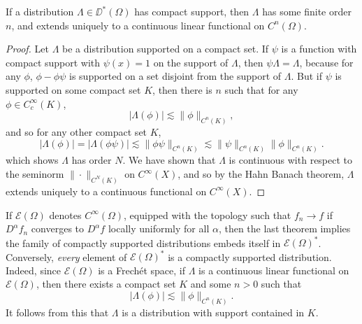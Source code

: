 \begin{theorem}
    If a distribution $\Lambda \in \DD^*(\Omega)$ has compact support, then $\Lambda$ has some finite order $n$, and extends uniquely to a continuous linear functional on $C^n(\Omega)$.
\end{theorem}
\begin{proof}
    Let $\Lambda$ be a distribution supported on a compact set. If $\psi$ is a function with compact support with $\psi(x) = 1$ on the support of $\Lambda$, then $\psi \Lambda = \Lambda$, because for any $\phi$, $\phi - \phi \psi$ is supported on a set disjoint from the support of $\Lambda$. But if $\psi$ is supported on some compact set $K$, then there is $n$ such that for any $\phi \in C_c^\infty(K)$,
    \[ |\Lambda(\phi)| \lesssim \| \phi \|_{C^n(K)}, \]
    and so for any other compact set $K$,
    \[ |\Lambda(\phi)| = |\Lambda(\phi \psi)| \lesssim \| \phi \psi \|_{C^n(K)} \lesssim \| \psi \|_{C^n(K)} \| \phi \|_{C^n(K)}. \]
    which shows $\Lambda$ has order $N$. We have shown that $\Lambda$ is continuous with respect to the seminorm $\| \cdot \|_{C^N(K)}$ on $C^\infty(X)$, and so by the Hahn Banach theorem, $\Lambda$ extends uniquely to a continuous functional on $C^\infty(X)$.
\end{proof}

If $\mathcal{E}(\Omega)$ denotes $C^\infty(\Omega)$, equipped with the topology such that $f_n \to f$ if $D^\alpha f_n$ converges to $D^\alpha f$ locally uniformly for all $\alpha$, then the last theorem implies the family of compactly supported distributions embeds itself in $\mathcal{E}(\Omega)^*$. Conversely, \emph{every} element of $\mathcal{E}(\Omega)^*$ is a compactly supported distribution. Indeed, since $\mathcal{E}(\Omega)$ is a Frech\'{e}t space, if $\Lambda$ is a continuous linear functional on $\mathcal{E}(\Omega)$, then there exists a compact set $K$ and some $n > 0$ such that
%
\[ |\Lambda(\phi)| \lesssim \| \phi \|_{C^n(K)}. \]
%
It follows from this that $\Lambda$ is a distribution with support contained in $K$.

